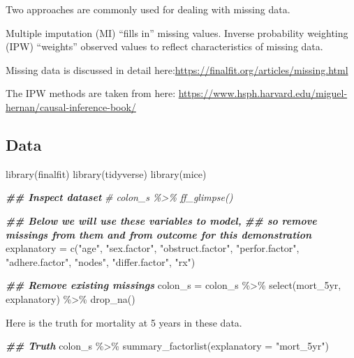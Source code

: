 \documentclass[
]{book}
\newenvironment{Shaded}{\begin{snugshade}}{\end{snugshade}}
\newcommand{\AttributeTok}[1]{\textcolor[rgb]{0.77,0.63,0.00}{#1}}
\newcommand{\CommentTok}[1]{\textcolor[rgb]{0.56,0.35,0.01}{\textit{#1}}}
\newcommand{\DocumentationTok}[1]{\textcolor[rgb]{0.56,0.35,0.01}{\textbf{\textit{#1}}}}
\newcommand{\FunctionTok}[1]{\textcolor[rgb]{0.00,0.00,0.00}{#1}}
\newcommand{\NormalTok}[1]{#1}
\newcommand{\OtherTok}[1]{\textcolor[rgb]{0.56,0.35,0.01}{#1}}
\newcommand{\SpecialCharTok}[1]{\textcolor[rgb]{0.00,0.00,0.00}{#1}}
\newcommand{\StringTok}[1]{\textcolor[rgb]{0.31,0.60,0.02}{#1}}
\begin{document}
Two approaches are commonly used for dealing with missing data.

Multiple imputation (MI) ``fills in'' missing values. Inverse probability weighting (IPW) ``weights'' observed values to reflect characteristics of missing data.

Missing data is discussed in detail here:\url{https://finalfit.org/articles/missing.html}

The IPW methods are taken from here: \url{https://www.hsph.harvard.edu/miguel-hernan/causal-inference-book/}

\hypertarget{data}{%
\subsection{Data}\label{data}}

\begin{Shaded}
\begin{Highlighting}[]
\FunctionTok{library}\NormalTok{(finalfit)}
\FunctionTok{library}\NormalTok{(tidyverse)}
\FunctionTok{library}\NormalTok{(mice)}

\DocumentationTok{\#\# Inspect dataset}
\CommentTok{\# colon\_s \%\textgreater{}\% ff\_glimpse()}

\DocumentationTok{\#\# Below we will use these variables to model, }
\DocumentationTok{\#\# so remove missings from them and from outcome for this demonstration}
\NormalTok{explanatory }\OtherTok{=} \FunctionTok{c}\NormalTok{(}\StringTok{"age"}\NormalTok{, }
                \StringTok{"sex.factor"}\NormalTok{, }
                \StringTok{"obstruct.factor"}\NormalTok{, }
                \StringTok{"perfor.factor"}\NormalTok{,}
                \StringTok{"adhere.factor"}\NormalTok{,}
                \StringTok{"nodes"}\NormalTok{,}
                \StringTok{"differ.factor"}\NormalTok{,}
                \StringTok{"rx"}\NormalTok{)}


\DocumentationTok{\#\# Remove existing missings}
\NormalTok{colon\_s }\OtherTok{=}\NormalTok{ colon\_s }\SpecialCharTok{\%\textgreater{}\%} 
  \FunctionTok{select}\NormalTok{(mort\_5yr, explanatory) }\SpecialCharTok{\%\textgreater{}\%} 
  \FunctionTok{drop\_na}\NormalTok{()}
\end{Highlighting}
\end{Shaded}

Here is the truth for mortality at 5 years in these data.

\begin{Shaded}
\begin{Highlighting}[]
\DocumentationTok{\#\# Truth}
\NormalTok{colon\_s }\SpecialCharTok{\%\textgreater{}\%} 
  \FunctionTok{summary\_factorlist}\NormalTok{(}\AttributeTok{explanatory =} \StringTok{"mort\_5yr"}\NormalTok{)}
\end{Highlighting}
\end{Shaded}
\end{document}
